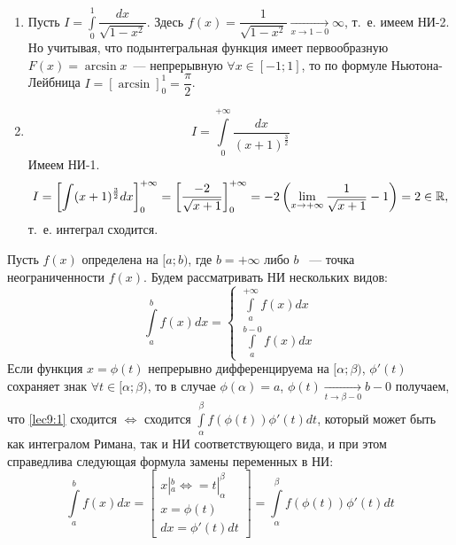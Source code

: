 \documentclass[../../main.tex]{subfiles}
\begin{document}
\begin{exmps}
\begin{enumerate}
	\item Пусть $I = \displaystyle\int\limits_{0}^1 \dfrac{dx}{\sqrt{1 - x^2}} $.
	Здесь $ f(x) = \dfrac{1}{\sqrt{1 - x^2}} \underset{x \to 1 - 0}{\to}
	\infty $, т.~е. имеем НИ-2. Но учитывая, что подынтегральная функция 
	имеет первообразную $ F(x) = \arcsin{x}$~--- непрерывную $ \forall x
	\in [-1; 1] $, то по формуле Ньютона-Лейбница $ 
	I = \left[\arcsin \right]_0^1 = \dfrac{\pi}{2} $.
	\item \[I = \int\limits_{0}^{+\infty} \dfrac{dx}{(x + 1)^{\frac{3}{2}}}\]
	Имеем НИ-1. \[I = \left[ \int (x + 1)^{\frac{3}{2}} dx\right]_0^{+\infty} 
	= \left[ \dfrac{-2}{\sqrt{x + 1}} \right]_0^{+\infty} = -2 \left(
	\lim\limits_{x \to + \infty} \dfrac{1}{\sqrt{x + 1}} - 1 \right) = 2
	\in \mathbb{R},\] т.~е. интеграл сходится.
\end{enumerate}
\end{exmps}
\begin{thm}
	Пусть $ f(x) $ определена на $ [a; b) $, где $ b = +\infty $ либо $ b $ ~---
	точка неограниченности $ f(x) $.
	Будем рассматривать НИ нескольких видов:
	\begin{equation}
		\label{lec9:1}
		\int\limits_a^b f(x) dx = 
		\begin{cases}
			\int\limits_a^{+\infty} f(x) dx\\
			\int\limits_{a}^{b - 0} f(x) dx
		\end{cases}
	\end{equation}
	Если функция $ x = \phi(t) $ непрерывно дифференцируема на $ [\alpha; \beta) 
	$,
	$ \phi'(t) $ сохраняет знак $ \forall t \in [\alpha; \beta) $, то
	в случае $ \phi(\alpha) = a $, $ \phi(t) \underset{t \to \beta - 0}{\to} b - 
	0
	$ получаем, что \eqref{lec9:1} сходится $\iff$ сходится
	$ \int\limits_\alpha^\beta f(\phi(t)) \phi'(t) dt $, который может быть как
	интегралом Римана, так и НИ соответствующего вида, и при этом справедлива 
	следующая формула замены переменных в НИ:
	\begin{equation}
		\label{lec9:2}
		\int\limits_a^b f(x) dx = 
		\begin{bmatrix}
			x|_a^b \iff= t|_\alpha^\beta\\
			x = \phi(t)\\
			dx = \phi'(t)dt
		\end{bmatrix} =
		\int\limits_\alpha^\beta f(\phi(t)) \phi'(t) dt
	\end{equation}
\end{thm}
\end{document}
